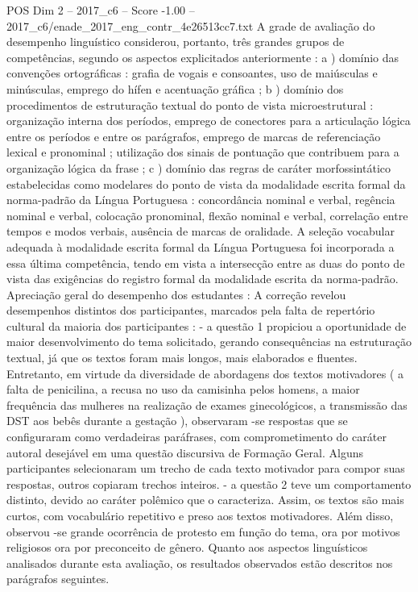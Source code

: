 \begin{textsample}{POS Dim 2 – 2017\_c6 – Score -1.00 – 2017\_c6/enade\_2017\_eng\_contr\_4e26513cc7.txt}
A grade de avaliação do desempenho linguístico considerou, portanto, três grandes grupos de competências, segundo os aspectos explicitados anteriormente : a ) domínio das convenções ortográficas : grafia de vogais e consoantes, uso de maiúsculas e minúsculas, emprego do hífen e acentuação gráfica ; b ) domínio dos procedimentos de estruturação textual do ponto de vista microestrutural : organização interna dos períodos, emprego de conectores para a articulação lógica entre os períodos e entre os parágrafos, emprego de marcas de referenciação lexical e pronominal ; utilização dos sinais de pontuação que contribuem para a organização lógica da frase ; c ) domínio das regras de caráter morfossintático estabelecidas como modelares do ponto de vista da modalidade escrita formal da norma-padrão da Língua Portuguesa : concordância nominal e verbal, regência nominal e verbal, colocação pronominal, flexão nominal e verbal, correlação entre tempos e modos verbais, ausência de marcas de oralidade.
A seleção vocabular adequada à modalidade escrita formal da Língua Portuguesa foi incorporada a essa última competência, tendo em vista a intersecção entre as duas do ponto de vista das exigências do registro formal da modalidade escrita da norma-padrão.
Apreciação geral do desempenho dos estudantes : A correção revelou desempenhos distintos dos participantes, marcados pela falta de repertório cultural da maioria dos participantes : - a questão 1 propiciou a oportunidade de maior desenvolvimento do tema solicitado, gerando consequências na estruturação textual, já que os textos foram mais longos, mais elaborados e fluentes.
Entretanto, em virtude da diversidade de abordagens dos textos motivadores ( a falta de penicilina, a recusa no uso da camisinha pelos homens, a maior frequência das mulheres na realização de exames ginecológicos, a transmissão das DST aos bebês durante a gestação ), observaram -se respostas que se configuraram como verdadeiras paráfrases, com comprometimento do caráter autoral desejável em uma questão discursiva de Formação Geral.
Alguns participantes selecionaram um trecho de cada texto motivador para compor suas respostas, outros copiaram trechos inteiros. - a questão 2 teve um comportamento distinto, devido ao caráter polêmico que o caracteriza.
Assim, os textos são mais curtos, com vocabulário repetitivo e preso aos textos motivadores.
Além disso, observou -se grande ocorrência de protesto em função do tema, ora por motivos religiosos ora por preconceito de gênero.
Quanto aos aspectos linguísticos analisados durante esta avaliação, os resultados observados estão descritos nos parágrafos seguintes.

\end{textsample}
